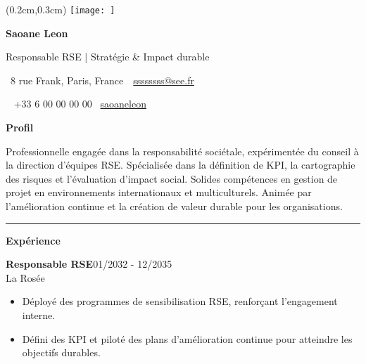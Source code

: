 \documentclass[a4paper]{article}
\renewcommand{\colorbox}[2]{#2}%
\newcommand{\fullrule}{\hspace{-1.5cm}\rule{\paperwidth}{0.4pt}}
\newcommand{\cvsection}[1]{%
  \vspace{6pt}\textbf{\Large #1}\par\vspace{2pt}}
\begin{document}
\ifx\relax\relax\else
\begin{textblock*}{4cm}(0.2cm,0.3cm)
  \texttt{[image: ]}
\end{textblock*}
 \fi
\begin{center}
  {\fontsize{44pt}{24pt}\selectfont\bfseries Saoane Leon}

  \bigskip
  {\Large Responsable RSE | Stratégie \& Impact durable}

  \bigskip\bigskip
  \faMapMarker~8 rue Frank, Paris, France\ 
  \quad\faEnvelope~\href{mailto:ssssssss@see.fr}{ssssssss@see.fr}

  \bigskip
  \faPhone~ +33 6 00 00 00 00
  \quad \faLinkedin\ \href{linkedin.com/in/saoaneleon}{saoaneleon}
 

  
\end{center}
 \vspace{0.6cm}
\cvsection{Profil}
\vspace{0.3cm}
Professionnelle engagée dans la responsabilité sociétale, expérimentée du conseil à la direction d’équipes RSE. Spécialisée dans la définition de KPI, la cartographie des risques et l’évaluation d’impact social. Solides compétences en gestion de projet en environnements internationaux et multiculturels. Animée par l’amélioration continue et la création de valeur durable pour les organisations.

\medskip\fullrule

\cvsection{Expérience}
\vspace{0.3cm}
\colorbox{maincolor}{%
  \begin{minipage}{\linewidth}
    \noindent
    \textbf{Responsable RSE}\hfill 01/2032 - 12/2035\\
    La Rosée\\[-0.3em]
    \begin{itemize}[leftmargin=*]
      \item Déployé des programmes de sensibilisation RSE, renforçant l’engagement interne. \item Défini des KPI et piloté des plans d’amélioration continue pour atteindre les objectifs durables.
    \end{itemize}
  \end{minipage}}
\end{document}
